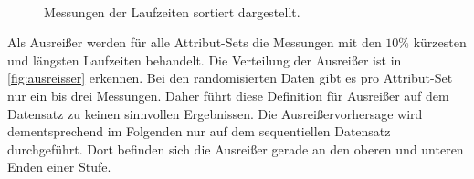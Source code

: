 \documentclass[
	12pt,
	a4paper,
	BCOR10mm,
	DIV14,
	listof=totoc,
	bibliography=totoc,
	headsepline
]{scrreprt}
\begin{document}
\begin{figure}
	\hfill
	\\
	\hfill
	\caption{Messungen der Laufzeiten sortiert dargestellt.}
	\label{Laufzeiten_Sortiert}
\end{figure} 

Als Ausreißer werden für alle Attribut-Sets die Messungen mit den $10\%$ kürzesten und längsten Laufzeiten behandelt. Die Verteilung der Ausreißer ist in \ref{fig:ausreisser} erkennen.
Bei den randomisierten Daten gibt es pro Attribut-Set nur ein bis drei Messungen. Daher führt diese Definition für Ausreißer auf dem Datensatz zu keinen sinnvollen Ergebnissen. 
Die Ausreißervorhersage wird dementsprechend im Folgenden nur auf dem sequentiellen Datensatz durchgeführt.
Dort befinden sich die Ausreißer gerade an den oberen und unteren Enden einer Stufe.
\end{document}
